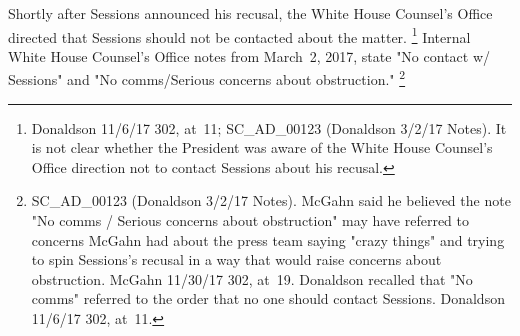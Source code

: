 Shortly after Sessions announced his recusal, the White House Counsel's Office directed that Sessions should not be contacted about the matter.%
\footnote{Donaldson 11/6/17 302, at~11;
SC\_AD\_00123 (Donaldson 3/2/17 Notes).
It is not clear whether the President was aware of the White House Counsel's Office direction not to contact Sessions about his recusal.}
Internal White House Counsel's Office notes from March~2, 2017, state "No contact w/ Sessions" and "No comms/Serious concerns about obstruction."%
\footnote{SC\_AD\_00123 (Donaldson 3/2/17 Notes).
McGahn said he believed the note "No comms / Serious concerns about obstruction" may have referred to concerns McGahn had about the press team saying "crazy things" and trying to spin Sessions's recusal in a way that would raise concerns about obstruction.
McGahn 11/30/17 302, at~19.
Donaldson recalled that "No comms" referred to the order that no one should contact Sessions.
Donaldson 11/6/17 302, at~11.}

